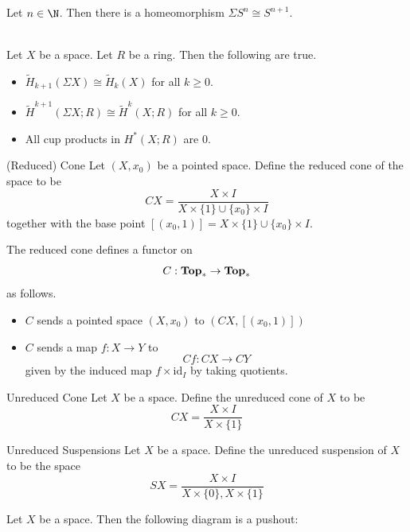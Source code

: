 \documentclass[a4paper]{article}
\begin{document}
\begin{eg}{}{} Let $n\in\N$. Then there is a homeomorphism $\Sigma S^n\cong S^{n+1}$. 
\end{eg}

\begin{prp}{}{}\\
Let $X$ be a space. Let $R$ be a ring. Then the following are true. 
\begin{itemize}
\item $\widetilde{H}_{k+1}(\Sigma X)\cong\widetilde{H}_k(X)$ for all $k\geq 0$. 
\item $\widetilde{H}^{k+1}(\Sigma X;R)\cong\widetilde{H}^k(X;R)$ for all $k\geq 0$. 
\item All cup products in $H^\ast(X;R)$ are $0$. 
\end{itemize}
\end{prp}

\begin{defn}{(Reduced) Cone}{} Let $(X,x_0)$ be a pointed space. Define the reduced cone of the space to be $$CX=\frac{X\times I}{X\times\{1\}\cup\{x_0\}\times I}$$ together with the base point $[(x_0,1)]=X\times\{1\}\cup\{x_0\}\times I$. 
\end{defn}

\begin{prp}{}{} The reduced cone defines a functor on $$C:\bold{Top}_\ast\to\bold{Top}_\ast$$ as follows. 
\begin{itemize}
\item $C$ sends a pointed space $(X,x_0)$ to $(CX,[(x_0,1)])$
\item $C$ sends a map $f:X\to Y$ to $$Cf:CX\to CY$$ given by the induced map $f\times\text{id}_I$ by taking quotients. 
\end{itemize}
\end{prp}

\begin{defn}{Unreduced Cone}{} Let $X$ be a space. Define the unreduced cone of $X$ to be $$CX=\frac{X\times I}{X\times\{1\}}$$
\end{defn}

\begin{defn}{Unreduced Suspensions}{} Let $X$ be a space. Define the unreduced suspension of $X$ to be the space $$SX=\frac{X\times I}{X\times\{0\},X\times\{1\}}$$
\end{defn}

\begin{prp}{}{} Let $X$ be a space. Then the following diagram is a pushout: \\
\\
\end{prp}
\end{document}
